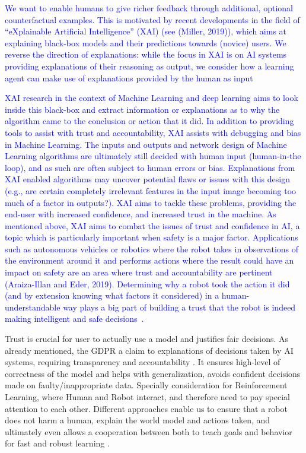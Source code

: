 \documentclass[twoside,11pt]{article}
\begin{document}
\textcolor{blue}{We want to enable humans to give richer feedback through additional, optional counterfactual examples. This is motivated by recent developments in the field of “eXplainable Artificial Intelligence” (XAI) (see (Miller, 2019)), which aims at explaining black-box models and their predictions towards (novice) users. We reverse the direction of explanations: while the focus in XAI is on AI systems providing explanations of their reasoning as output, we consider how a learning agent can make use of explanations provided by the human as input~\cite{Karalus:2021:HITL-counterfactuals}}

\textcolor{blue}{XAI research in the context of Machine Learning and
deep learning aims to look inside this black-box and extract
information or explanations as to why the algorithm came to the
conclusion or action that it did. In addition to providing tools to
assist with trust and accountability, XAI assists with debugging
and bias in Machine Learning. The inputs and outputs and
network design of Machine Learning algorithms are ultimately
still decided with human input (human-in-the loop), and as such
are often subject to human errors or bias. Explanations from
XAI enabled algorithms may uncover potential flaws or issues
with this design (e.g., are certain completely irrelevant features
in the input image becoming too much of a factor in outputs?).
XAI aims to tackle these problems, providing the end-user
with increased confidence, and increased trust in the machine. As mentioned above, XAI aims to combat the issues of trust
and confidence in AI, a topic which is particularly important
when safety is a major factor. Applications such as autonomous
vehicles or robotics where the robot takes in observations of
the environment around it and performs actions where the
result could have an impact on safety are an area where trust
and accountability are pertinent (Araiza-Illan and Eder, 2019).
Determining why a robot took the action it did (and by extension
knowing what factors it considered) in a human-understandable
way plays a big part of building a trust that the robot is indeed
making intelligent and safe decisions~\cite{wells2021explainable}.}

Trust is crucial for user to actually use a model and justifies fair decisions. As already mentioned, the GDPR \cite{Schneeberger:2020:legalAI} a claim to explanations of decisions taken by AI systems, requiring transparency and accountability \cite{Stoeger:2021:MedicalAI}. It ensures high-level of correctness of the model and helps with generalization, avoids confident decisions made on faulty/inappropriate data. Specially consideration for Reinforcement Learning, where Human and Robot interact, and therefore need to pay special attention to each other. Different approaches enable us to ensure that a robot does not harm a human, explain the world model and actions taken, and ultimately even allows a cooperation between both to teach goals and behavior for fast and robust learning \cite{PuiuttaVeith:2020:xAIRLSurvey}.
\end{document}
